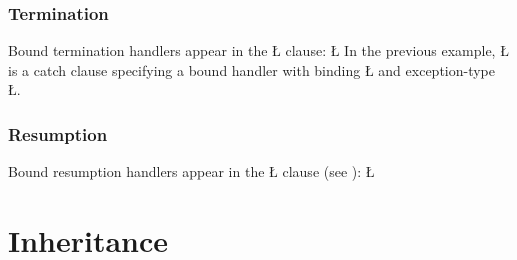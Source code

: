 \documentclass[openright,twoside]{report}
\begin{document}
\subsubsection{Termination}

Bound termination handlers appear in the \CC \LGinlinetrue\LGbegin\lgrinde\L{}\endlgrinde\LGend{} clause:
\LGinlinefalse\LGbegin\lgrinde
\L{}
\endlgrinde\LGend
In the previous example, \LGinlinetrue\LGbegin\lgrinde\L{}\endlgrinde\LGend{} is a catch clause specifying a bound handler with binding \LGinlinetrue\LGbegin\lgrinde\L{}\endlgrinde\LGend{} and exception-type \LGinlinetrue\LGbegin\lgrinde\L{}\endlgrinde\LGend{}.


\subsubsection{Resumption}

Bound resumption handlers appear in the \uC \LGinlinetrue\LGbegin\lgrinde\L{}\endlgrinde\LGend{} clause (see ):
\LGinlinefalse\LGbegin\lgrinde
\L{}
\endlgrinde\LGend


\section{Inheritance}
\label{s:InheritanceEHM}
\end{document}
